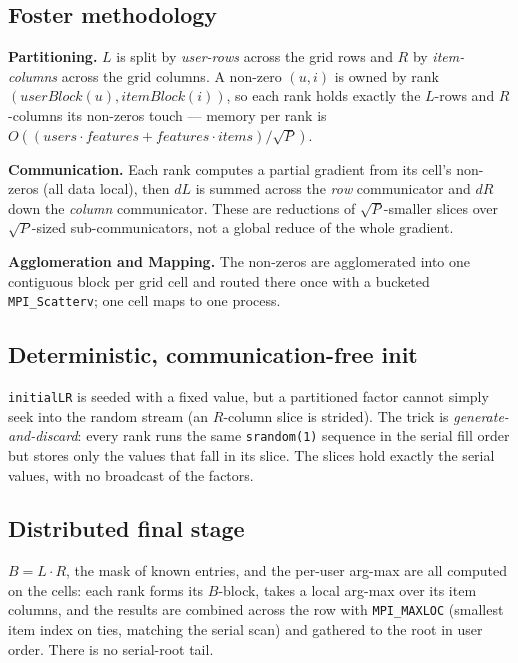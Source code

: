 \documentclass[twocolumn]{article}
\begin{document}
    \subsection{Foster methodology}\label{subsec:foster}
    \textbf{Partitioning.} $L$ is split by \emph{user-rows} across the grid rows and $R$ by
    \emph{item-columns} across the grid columns. A non-zero $(u,i)$ is owned by rank
    $(\textit{userBlock}(u), \textit{itemBlock}(i))$, so each rank holds exactly the
    $L$-rows and $R$-columns its non-zeros touch --- memory per rank is
    $O((\textit{users} \cdot \textit{features} + \textit{features} \cdot
    \textit{items})/\sqrt{P})$.

    \textbf{Communication.} Each rank computes a partial gradient from its cell's
    non-zeros (all data local), then $dL$ is summed across the \emph{row} communicator and
    $dR$ down the \emph{column} communicator. These are reductions of $\sqrt{P}$-smaller
    slices over $\sqrt{P}$-sized sub-communicators, not a global reduce of the whole
    gradient.

    \textbf{Agglomeration and Mapping.} The non-zeros are agglomerated into one contiguous
    block per grid cell and routed there once with a bucketed \texttt{MPI\_Scatterv}; one
    cell maps to one process.

    \subsection{Deterministic, communication-free init}\label{subsec:init}
    \texttt{initialLR} is seeded with a fixed value, but a partitioned factor cannot simply
    seek into the random stream (an $R$-column slice is strided). The trick is
    \emph{generate-and-discard}: every rank runs the same \texttt{srandom(1)} sequence in
    the serial fill order but stores only the values that fall in its slice. The slices
    hold exactly the serial values, with no broadcast of the factors.

    \subsection{Distributed final stage}\label{subsec:final}
    $B = L \cdot R$, the mask of known entries, and the per-user arg-max are all computed
    on the cells: each rank forms its $B$-block, takes a local arg-max over its item
    columns, and the results are combined across the row with \texttt{MPI\_MAXLOC}
    (smallest item index on ties, matching the serial scan) and gathered to the root in
    user order. There is no serial-root tail.
\end{document}
